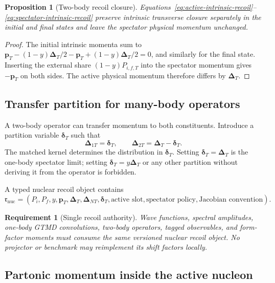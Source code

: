 \documentclass[11pt]{article}
\newtheorem{requirement}[definition]{Requirement}
\newtheorem{proposition}[definition]{Proposition}
\newcommand{\pT}{\bm{p}_{T}}
\newcommand{\DT}{\bm{\Delta}_{T}}
\newcommand{\DNT}{\bm{\Delta}_{N T}}
\newcommand{\nuc}{\mathrm{nuc}}
\begin{document}
\begin{proposition}[Two-body recoil closure]
\label{prop:recoil-closure}
Equations~\eqref{eq:active-intrinsic-recoil}--\eqref{eq:spectator-intrinsic-recoil}
preserve intrinsic transverse closure separately in the initial and final
states and leave the spectator physical momentum unchanged.
\end{proposition}

\begin{proof}
The initial intrinsic momenta sum to
\(
 \pT-(1-y)\DT/2-\pT+(1-y)\DT/2=0
\), and similarly for the final state.  Inserting the external share
\((1-y)P_{i,f,T}\) into the spectator momentum gives \(-\pT\) on both sides.
The active physical momentum therefore differs by \(\DT\).
\end{proof}

\subsection{Transfer partition for many-body operators}

A two-body operator can transfer momentum to both constituents.  Introduce a
partition variable \(\bm\delta_T\) such that
\begin{equation}
 \bm\Delta_{1T}=\bm\delta_T,
 \qquad
 \bm\Delta_{2T}=\DT-\bm\delta_T.
\label{eq:two-body-transfer-partition}
\end{equation}
The matched kernel determines the distribution in \(\bm\delta_T\).  Setting
\(\bm\delta_T=\DT\) is the one-body spectator limit; setting
\(\bm\delta_T=y\DT\) or any other partition without deriving it from the
operator is forbidden.

A typed nuclear recoil object contains
\begin{equation}
 \mathfrak r_{\nuc}
 =\left(
 P_i,P_f,
 y,\pT,
 \DT,\DNT,
 \bm\delta_T,
 \text{active slot},
 \text{spectator policy},
 \text{Jacobian convention}
 \right).
\label{eq:nuclear-recoil-type}
\end{equation}

\begin{requirement}[Single recoil authority]
\label{req:single-recoil-authority}
Wave functions, spectral amplitudes, one-body GTMD convolutions, two-body
operators, tagged observables, and form-factor moments must consume the same
versioned nuclear recoil object.  No projector or benchmark may reimplement
its shift factors locally.
\end{requirement}

\subsection{Partonic momentum inside the active nucleon}
\end{document}
